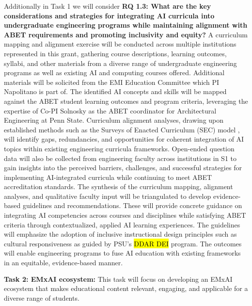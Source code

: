 \documentclass[11pt]{article}
\begin{document}
Additionally in Task 1 we will consider \textbf{RQ 1.3: What are the key considerations and strategies for integrating AI curricula into undergraduate engineering programs while maintaining alignment with ABET requirements and promoting inclusivity and equity?} 
A curriculum mapping and alignment exercise will be conducted across multiple institutions represented in this grant, gathering course descriptions, learning outcomes, syllabi, and other materials from a diverse range of undergraduate engineering programs as well as existing AI and computing courses offered. 
Additional materials will be solicited from the EMI Education Committee which PI Napolitano is part of.
The identified AI concepts and skills will be mapped against the ABET student learning outcomes and program criteria, leveraging the expertise of Co-PI Solnosky as the ABET coordinator for Architectural Engineering at Penn State. 
Curriculum alignment analyses, drawing upon established methods such as the Surveys of Enacted Curriculum (SEC) model \cite{blank2005surveys}, will identify gaps, redundancies, and opportunities for coherent integration of AI topics within existing engineering curricula frameworks. 
Open-ended question data will also be collected from engineering faculty across institutions in S1 to gain insights into the perceived barriers, challenges, and successful strategies for implementing AI-integrated curricula while continuing to meet ABET accreditation standards. 
The synthesis of the curriculum mapping, alignment analyses, and qualitative faculty input will be triangulated to develop evidence-based guidelines and recommendations. 
These will provide concrete guidance on integrating AI competencies across courses and disciplines while satisfying ABET criteria through contextualized, applied AI learning experiences. 
The guidelines will emphasize the adoption of inclusive instructional design principles such as cultural responsiveness as guided by PSU's \hl{DDAR DEI} program.
The outcomes will enable engineering programs to fuse AI education with existing frameworks in an equitable, evidence-based manner.

\begin{tcolorbox}[colback=mycmykcolor, colframe=black, boxrule=1pt, coltext=black]
\textbf{Task 2: EMxAI ecosystem:} This task will focus on developing an EMxAI ecosystem that makes educational content relevant, engaging, and applicable for a diverse range of students.
\end{tcolorbox}
\end{document}
